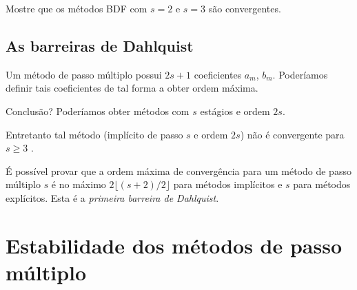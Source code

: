 \begin{exer}
Mostre que os métodos BDF com $s=2$ e $s=3$ são convergentes.
\end{exer}



\subsection{As barreiras de Dahlquist}
Um método de passo múltiplo possui $2s+1$ coeficientes $a_m$, $b_m$. Poderíamos definir tais coeficientes de tal forma a obter ordem máxima.

Conclusão? Poderíamos obter métodos com $s$ estágios e ordem $2s$.

Entretanto tal método (implícito de passo $s$ e ordem $2s$) não é convergente para $s\geq 3$ .

É possível provar que a ordem máxima de convergência para um método de passo múltiplo $s$ é no máximo  $2\lfloor(s+2)/2\rfloor$ para métodos implícitos e $s$ para métodos explícitos. Esta é a \emph{primeira barreira de Dahlquist}.

\section{Estabilidade dos métodos de passo múltiplo}


